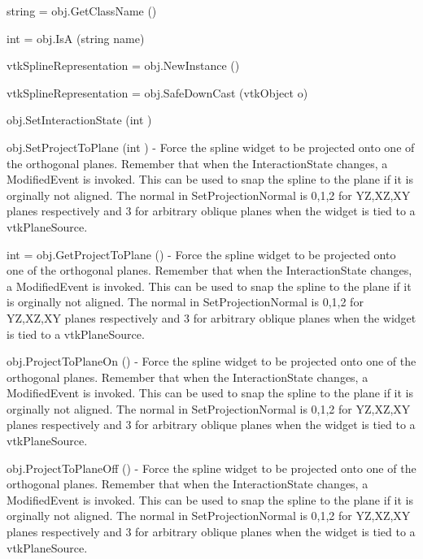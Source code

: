 \begin{DoxyItemize}
\item {\ttfamily string = obj.\-Get\-Class\-Name ()}  
\item {\ttfamily int = obj.\-Is\-A (string name)}  
\item {\ttfamily vtk\-Spline\-Representation = obj.\-New\-Instance ()}  
\item {\ttfamily vtk\-Spline\-Representation = obj.\-Safe\-Down\-Cast (vtk\-Object o)}  
\item {\ttfamily obj.\-Set\-Interaction\-State (int )}  
\item {\ttfamily obj.\-Set\-Project\-To\-Plane (int )} -\/ Force the spline widget to be projected onto one of the orthogonal planes. Remember that when the Interaction\-State changes, a Modified\-Event is invoked. This can be used to snap the spline to the plane if it is orginally not aligned. The normal in Set\-Projection\-Normal is 0,1,2 for Y\-Z,X\-Z,X\-Y planes respectively and 3 for arbitrary oblique planes when the widget is tied to a vtk\-Plane\-Source.  
\item {\ttfamily int = obj.\-Get\-Project\-To\-Plane ()} -\/ Force the spline widget to be projected onto one of the orthogonal planes. Remember that when the Interaction\-State changes, a Modified\-Event is invoked. This can be used to snap the spline to the plane if it is orginally not aligned. The normal in Set\-Projection\-Normal is 0,1,2 for Y\-Z,X\-Z,X\-Y planes respectively and 3 for arbitrary oblique planes when the widget is tied to a vtk\-Plane\-Source.  
\item {\ttfamily obj.\-Project\-To\-Plane\-On ()} -\/ Force the spline widget to be projected onto one of the orthogonal planes. Remember that when the Interaction\-State changes, a Modified\-Event is invoked. This can be used to snap the spline to the plane if it is orginally not aligned. The normal in Set\-Projection\-Normal is 0,1,2 for Y\-Z,X\-Z,X\-Y planes respectively and 3 for arbitrary oblique planes when the widget is tied to a vtk\-Plane\-Source.  
\item {\ttfamily obj.\-Project\-To\-Plane\-Off ()} -\/ Force the spline widget to be projected onto one of the orthogonal planes. Remember that when the Interaction\-State changes, a Modified\-Event is invoked. This can be used to snap the spline to the plane if it is orginally not aligned. The normal in Set\-Projection\-Normal is 0,1,2 for Y\-Z,X\-Z,X\-Y planes respectively and 3 for arbitrary oblique planes when the widget is tied to a vtk\-Plane\-Source.  

\end{DoxyItemize}
